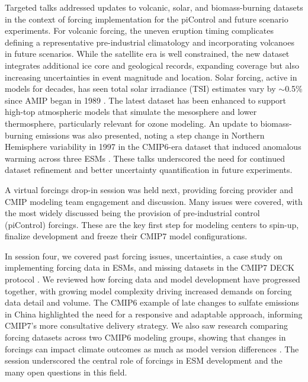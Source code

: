 \documentclass{ametsocV6.1}
\begin{document}
Targeted talks addressed updates to volcanic, solar, and biomass-burning datasets in the context of forcing implementation for the piControl and future scenario experiments. For volcanic forcing, the uneven eruption timing complicates defining a representative pre-industrial climatology and incorporating volcanoes in future scenarios. While the satellite era is well constrained, the new dataset integrates additional ice core and geological records, expanding coverage but also increasing uncertainties in event magnitude and location. Solar forcing, active in models for decades, has seen total solar irradiance (TSI) estimates vary by $\sim$0.5\% since AMIP began in 1989 \citep{durack_coupled_2025}. The latest dataset has been enhanced to support high-top atmospheric models that simulate the mesosphere and lower thermosphere, particularly relevant for ozone modeling. An update to biomass-burning emissions was also presented, noting a step change in Northern Hemisphere variability in 1997 in the CMIP6-era dataset that induced anomalous warming across three ESMs \cite[e.g.,][]{fasullo_overview_2024,holland_new_2024}. These talks underscored the need for continued dataset refinement and better uncertainty quantification in future experiments.

A virtual forcings drop-in session was held next, providing forcing provider and CMIP modeling team engagement and discussion. Many issues were covered, with the most widely discussed being the provision of pre-industrial control (piControl) forcings. These are the key first step for modeling centers to spin-up, finalize development and freeze their CMIP7 model configurations.

In session four, we covered past forcing issues, uncertainties, a case study on implementing forcing data in ESMs, and missing datasets in the CMIP7 DECK protocol \citep{dunne_evolving_2024}. We reviewed how forcing data and model development have progressed together, with growing model complexity driving increased demands on forcing data detail and volume. The CMIP6 example of late changes to sulfate emissions in China highlighted the need for a responsive and adaptable approach, informing CMIP7’s more consultative delivery strategy. We also saw research comparing forcing datasets across two CMIP6 modeling groups, showing that changes in forcings can impact climate outcomes as much as model version differences \citep{fyfe_significant_2021,holland_new_2024}. The session underscored the central role of forcings in ESM development and the many open questions in this field.
\end{document}
